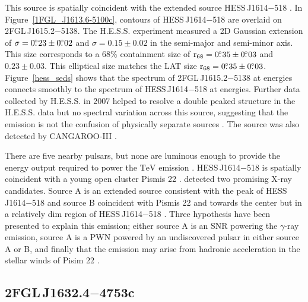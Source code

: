\documentclass[12pt,preprint]{aastex}
\newcommand{\gev}{\text{GeV}\xspace}
\newcommand{\tev}{\text{TeV}\xspace}
\newcommand{\suzaku}{\text{{\em Suzaku}}\xspace}
\newcommand{\rsixeight}{{\ensuremath{\text{r}_{68}}}\xspace}
\newcommand{\hl}[1]{#1}
\begin{document}
This source is spatially coincident with the extended
\tev source HESS\,J1614$-$518 \citep{hess_plane_survey}. In
Figure~\ref{1FGL_J1613.6-5100c}, contours of HESS\,J1614$-$518 are overlaid
on 2FGL\,J1615.2$-$5138.  The H.E.S.S. experiment measured a 2D Gaussian
extension of $\sigma=0\mbox{$.\!\!^\circ$}23\pm0\mbox{$.\!\!^\circ$}02$ and $\sigma=0.15\pm0.02$
in the semi-major and semi-minor axis. This size corresponds
to a 68\% containment size of $\rsixeight=0\fdg35\pm0\fdg03$
and $0.23\pm0.03$.  This elliptical size matches the LAT size
$\rsixeight=0\fdg35\pm0\fdg03$.  Figure~\ref{hess_seds} shows
that the spectrum of 2FGL\,J1615.2$-$5138 at \gev energies
connects smoothly to
the spectrum of HESS\,J1614$-$518 at \tev energies.  Further data collected by
H.E.S.S. in 2007 helped to resolve a double peaked structure in the
H.E.S.S. data but no spectral variation across this source, suggesting
that the emission is not the confusion of physically separate sources
\citep{closer_look_hess_j1614-518}.  The source was also detected by
CANGAROO-III \citep{cangaroo_j1614-518}.

\hl{
There are five nearby pulsars, but none are luminous enough to
provide the energy output required to power the $\tev$ 
emission \citep{closer_look_hess_j1614-518}.  HESS\,J1614$-$518
is spatially coincident with a young open cluster Pismis 22
\citep{hess_1614_landi_atel,closer_look_hess_j1614-518}.
\suzaku detected two
promising X-ray candidates. Source A is an extended source consistent
with the peak of HESS\,J1614$-$518 and source B coincident with Pismis 22
and towards the center but in a relatively dim region of HESS\,J1614$-$518
\citep{suazku_hess_j1614_518}.  Three hypothesis have been presented to
explain this emission; either source A is an SNR powering the $\gamma$-ray
emission, source A is a PWN powered by an undiscovered pulsar in either
source A or B, and finally that the emission may arise from hadronic 
acceleration in the stellar winds of Pisim 22 \citep{cangaroo_j1614-518}.
}

\subsection{2FGL\,J1632.4$-$4753c}
\label{section_2FGL_J1632.4-4753c}


\end{document}
